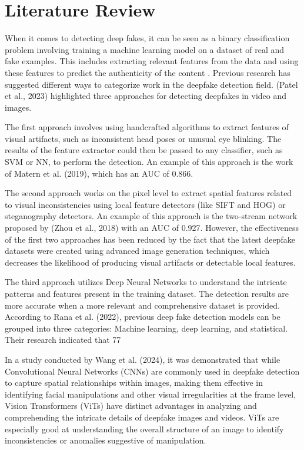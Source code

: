 \documentclass{svproc}
\begin{document}
\section{Literature Review}

When it comes to detecting deep fakes, it can be seen as a binary
classification problem involving training a machine learning model on a dataset
of real and fake examples. This includes extracting relevant features from the
data and using these features to predict the authenticity of the content
\cite{patel2023deepfake}. Previous research has suggested different ways to
categorize work in the deepfake detection field. (Patel et al.,
2023)\cite{patel2023deepfake} highlighted three approaches for detecting
deepfakes in video and images.

The first approach involves using handcrafted algorithms to extract features of
visual artifacts, such as inconsistent head poses or unusual eye blinking. The
results of the feature extractor could then be passed to any classifier, such
as SVM or NN, to perform the detection. An example of this approach is the work
of Matern et al. (2019)\cite{}, which has an AUC of 0.866.

The second approach works on the pixel level to extract spatial features
related to visual inconsistencies using local feature detectors (like SIFT and
HOG) or steganography detectors. An example of this approach is the two-stream
network proposed by (Zhou et al., 2018) with an AUC of 0.927. However, the
effectiveness of the first two approaches has been reduced by the fact that the
latest deepfake datasets were created using advanced image generation
techniques, which decreases the likelihood of producing visual artifacts or
detectable local features.

The third approach utilizes Deep Neural Networks to understand the intricate
patterns and features present in the training dataset. The detection results
are more accurate when a more relevant and comprehensive dataset is provided.
According to Rana et al. (2022), previous deep fake detection models can be
grouped into three categories: Machine learning, deep learning, and
statistical. Their research indicated that 77%

In a study conducted by Wang et al. (2024), it was demonstrated that while
Convolutional Neural Networks (CNNs) are commonly used in deepfake detection to
capture spatial relationships within images, making them effective in
identifying facial manipulations and other visual irregularities at the frame
level, Vision Transformers (ViTs) have distinct advantages in analyzing and
comprehending the intricate details of deepfake images and videos. ViTs are
especially good at understanding the overall structure of an image to identify
inconsistencies or anomalies suggestive of manipulation.
\end{document}
